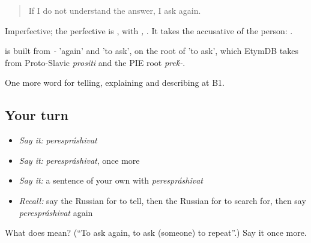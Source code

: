 \begin{quote}
If I do not understand the answer, I ask again.
\end{quote}

Imperfective; the perfective is \emph{}, with \emph{, }. It takes the accusative of the person: \emph{ }.

\begin{cousinweb}
\emph{} is built from \emph{-} 'again' and \emph{} 'to ask', on the root of \emph{} 'to ask', which EtymDB takes from Proto-Slavic \emph{prositi} and the PIE root \emph{pre\'{k}-}.
\end{cousinweb}

\begin{grammarlens}[title={What you've built}]
One more word for telling, explaining and describing at B1.
\end{grammarlens}

\subsection*{Your turn}
\begin{itemize}
\raggedright
  \item \emph{Say it:} \emph{perespráshivat}
  \item \emph{Say it:} \emph{perespráshivat}, once more
  \item \emph{Say it:} a sentence of your own with \emph{perespráshivat}
  \item \emph{Recall:} say the Russian for to tell, then the Russian for to search for, then say \emph{perespráshivat} again
\end{itemize}

\begin{tcolorbox}[breakable,colback=teal!4,colframe=teal!35!black,title={Before you move on}]
What does  mean? (\textquotedblleft{}To ask again, to ask (someone) to repeat\textquotedblright{}.) Say it once more.
\end{tcolorbox}
